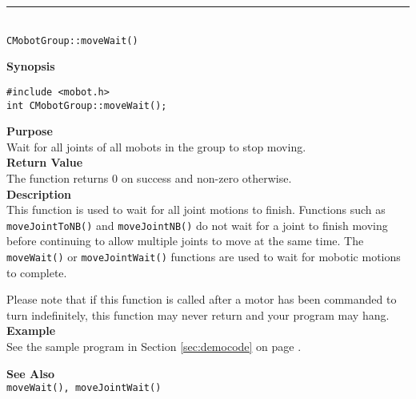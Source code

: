 \noindent
\vspace{5pt}
\rule{4.5in}{0.015in}\\
\noindent
{\LARGE \texttt{CMobotGroup::moveWait()}}\\
{}

\noindent
{\bf Synopsis}
\vspace{-8pt}
\begin{verbatim}
#include <mobot.h>
int CMobotGroup::moveWait();
\end{verbatim}

\noindent
{\bf Purpose}\\
Wait for all joints of all mobots in the group to stop moving.\\

\noindent
{\bf Return Value}\\
The function returns 0 on success and non-zero otherwise.\\

\noindent
{\bf Description}\\
This function is used to wait for all joint motions to finish. Functions such as
\texttt{moveJointToNB()} and \texttt{moveJointNB()} do not wait for a joint to finish
moving before continuing to allow multiple joints to move at the same time. The
\texttt{moveWait()} or \texttt{moveJointWait()} functions are used to wait for
mobotic motions to complete.

Please note that if this function is called after a motor has been commanded to
turn indefinitely, this function may never return and your program may hang.\\

\noindent
{\bf Example}\\
See the sample program in Section \ref{sec:democode} on page \pageref{sec:democode}.
\noindent

\noindent
{\bf See Also}\\
\texttt{moveWait(), moveJointWait()}

